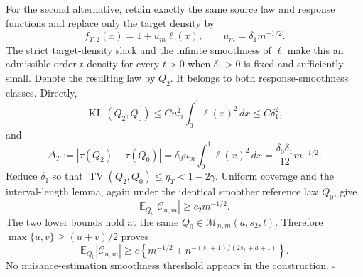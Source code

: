 For the second alternative, retain exactly the same source law and response functions and replace only the target density by
\[
f_{T,2}(x)=1+u_m\ell(x),
\qquad
u_m=\delta_1m^{-1/2}.
\]
The strict target-density slack and the infinite smoothness of \(\ell\) make this an admissible order-\(t\) density for every \(t>0\) when \(\delta_1>0\) is fixed and sufficiently small. Denote the resulting law by \(Q_2\). It belongs to both response-smoothness classes. Directly,
\[
\operatorname{KL}(Q_2,Q_0)
\le Cu_m^2\int_0^1\ell(x)^2\,dx
\le C\delta_1^2,
\]
and
\[
\Delta_T:=|\tau(Q_2)-\tau(Q_0)|
=\delta_0u_m\int_0^1\ell(x)^2\,dx
=\frac{\delta_0\delta_1}{12}m^{-1/2}.
\]
Reduce \(\delta_1\) so that \(\operatorname{TV}(Q_2,Q_0)\le\eta_T<1-2\gamma\). Uniform coverage and the interval-length lemma, again under the identical smoother reference law \(Q_0\), give
\[
\mathbb E_{Q_0}|\mathcal C_{n,m}|
\ge c_2m^{-1/2}.
\]
The two lower bounds hold at the same \(Q_0\in\mathcal M_{n,m}(a,s_2,t)\). Therefore \(\max\{u,v\}\ge(u+v)/2\) proves
\[
\mathbb E_{Q_0}|\mathcal C_{n,m}|
\ge c\left\{m^{-1/2}+n^{-(s_1+1)/(2s_1+a+1)}\right\}.
\]
No nuisance-estimation smoothness threshold appears in the construction. \(\square\)